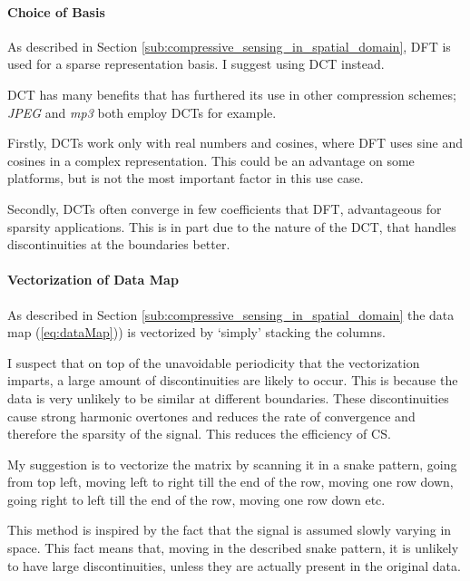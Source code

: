 \documentclass[Main]{subfiles}
\begin{document}
			\paragraph{Choice of Basis} %
			\label{par:choice_of_basis}
			
				As described in Section \ref{sub:compressive_sensing_in_spatial_domain}, DFT is used for a sparse representation basis.
				I suggest using DCT instead.

				DCT has many benefits that has furthered its use in other compression schemes; \emph{JPEG} and \emph{mp3} both employ DCTs for example.

				Firstly, DCTs work only with real numbers and cosines, where DFT uses sine and cosines in a complex representation. This could be an advantage on some platforms, but is not the most important factor in this use case.

				Secondly, DCTs often converge in few coefficients that DFT, advantageous for sparsity applications.
				This is in part due to the nature of the DCT, that handles discontinuities at the boundaries better.


			
			\paragraph{Vectorization of Data Map} %
			\label{par:vectorization_of_data_map}

				As described in Section \ref{sub:compressive_sensing_in_spatial_domain} the data map (\ref{eq:dataMap})) is vectorized by `simply' stacking the columns.

				I suspect that on top of the unavoidable periodicity that the vectorization imparts, a large amount of discontinuities are likely to occur.
				This is because the data is very unlikely to be similar at different boundaries.
				These discontinuities cause strong harmonic overtones and reduces the rate of convergence and therefore the sparsity of the signal.
				This reduces the efficiency of CS.

				My suggestion is to vectorize the matrix by scanning it in a snake pattern, going from top left, moving left to right till the end of the row, moving one row down, going right to left till the end of the row, moving one row down etc.

				This method is inspired by the fact that the signal is assumed slowly varying in space.
				This fact means that, moving in the described snake pattern, it is unlikely to have large discontinuities, unless they are actually present in the original data.

		


\end{document}
